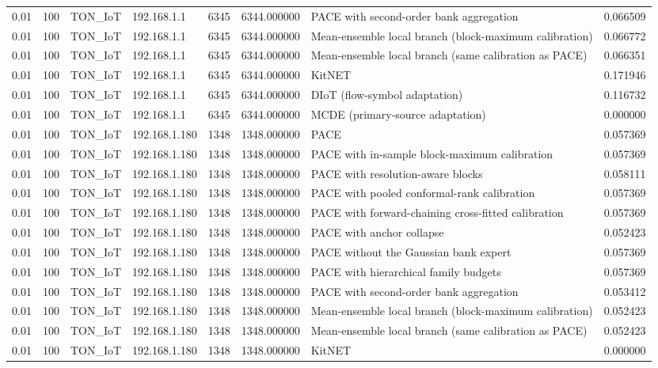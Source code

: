 \begin{tabular}{llllllll}
0.01 & 100 & TON\_IoT & 192.168.1.1 & 6345 & 6344.000000 & PACE with second-order bank aggregation & 0.066509 \\
0.01 & 100 & TON\_IoT & 192.168.1.1 & 6345 & 6344.000000 & Mean-ensemble local branch (block-maximum calibration) & 0.066772 \\
0.01 & 100 & TON\_IoT & 192.168.1.1 & 6345 & 6344.000000 & Mean-ensemble local branch (same calibration as PACE) & 0.066351 \\
0.01 & 100 & TON\_IoT & 192.168.1.1 & 6345 & 6344.000000 & KitNET & 0.171946 \\
0.01 & 100 & TON\_IoT & 192.168.1.1 & 6345 & 6344.000000 & DIoT (flow-symbol adaptation) & 0.116732 \\
0.01 & 100 & TON\_IoT & 192.168.1.1 & 6345 & 6344.000000 & MCDE (primary-source adaptation) & 0.000000 \\
0.01 & 100 & TON\_IoT & 192.168.1.180 & 1348 & 1348.000000 & PACE & 0.057369 \\
0.01 & 100 & TON\_IoT & 192.168.1.180 & 1348 & 1348.000000 & PACE with in-sample block-maximum calibration & 0.057369 \\
0.01 & 100 & TON\_IoT & 192.168.1.180 & 1348 & 1348.000000 & PACE with resolution-aware blocks & 0.058111 \\
0.01 & 100 & TON\_IoT & 192.168.1.180 & 1348 & 1348.000000 & PACE with pooled conformal-rank calibration & 0.057369 \\
0.01 & 100 & TON\_IoT & 192.168.1.180 & 1348 & 1348.000000 & PACE with forward-chaining cross-fitted calibration & 0.057369 \\
0.01 & 100 & TON\_IoT & 192.168.1.180 & 1348 & 1348.000000 & PACE with anchor collapse & 0.052423 \\
0.01 & 100 & TON\_IoT & 192.168.1.180 & 1348 & 1348.000000 & PACE without the Gaussian bank expert & 0.057369 \\
0.01 & 100 & TON\_IoT & 192.168.1.180 & 1348 & 1348.000000 & PACE with hierarchical family budgets & 0.057369 \\
0.01 & 100 & TON\_IoT & 192.168.1.180 & 1348 & 1348.000000 & PACE with second-order bank aggregation & 0.053412 \\
0.01 & 100 & TON\_IoT & 192.168.1.180 & 1348 & 1348.000000 & Mean-ensemble local branch (block-maximum calibration) & 0.052423 \\
0.01 & 100 & TON\_IoT & 192.168.1.180 & 1348 & 1348.000000 & Mean-ensemble local branch (same calibration as PACE) & 0.052423 \\
0.01 & 100 & TON\_IoT & 192.168.1.180 & 1348 & 1348.000000 & KitNET & 0.000000 \\

\end{tabular}
